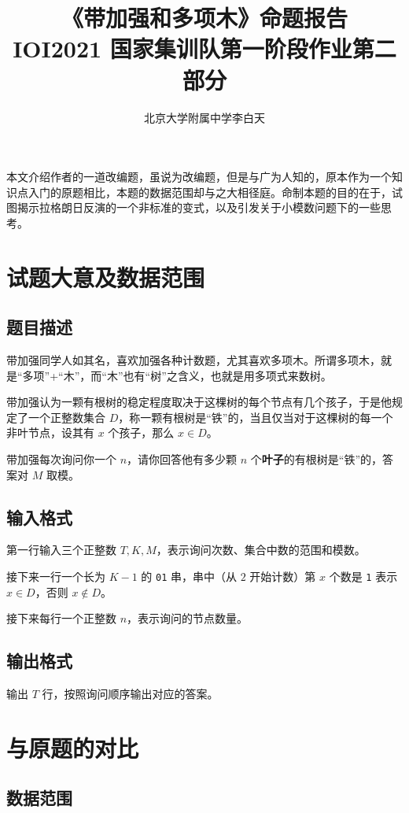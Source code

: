 \documentclass[12pt]{ctexart}
\title{《带加强和多项木》命题报告\\
\large IOI2021 国家集训队第一阶段作业第二部分}
\author{北京大学附属中学\quad 李白天}
\begin{document}
\maketitle

本文介绍作者的一道改编题，虽说为改编题，但是与广为人知的，原本作为一个知识点入门的原题相比，本题的数据范围却与之大相径庭。命制本题的目的在于，试图揭示拉格朗日反演的一个非标准的变式，以及引发关于小模数问题下的一些思考。

\section{试题大意及数据范围}

\subsection{题目描述}

带加强同学人如其名，喜欢加强各种计数题，尤其喜欢多项木。所谓多项木，就是“多项”+“木”，而“木”也有“树”之含义，也就是用多项式来数树。

带加强认为一颗有根树的稳定程度取决于这棵树的每个节点有几个孩子，于是他规定了一个正整数集合 $D$，称一颗有根树是“铁”的，当且仅当对于这棵树的每一个非叶节点，设其有 $x$ 个孩子，那么 $x\in D$。

带加强每次询问你一个 $n$，请你回答他有多少颗 $n$ 个\textbf{叶子}的有根树是“铁”的，答案对 $M$ 取模。

\subsection{输入格式}

第一行输入三个正整数 $T, K, M$，表示询问次数、集合中数的范围和模数。

接下来一行一个长为 $K-1$ 的 \texttt{01} 串，串中（从 $2$ 开始计数）第 $x$ 个数是 \texttt{1} 表示 $x\in D$，否则 $x\notin D$。

接下来每行一个正整数 $n$，表示询问的节点数量。

\subsection{输出格式}

输出 $T$ 行，按照询问顺序输出对应的答案。

\section{与原题的对比}

\subsection{数据范围}
\end{document}
